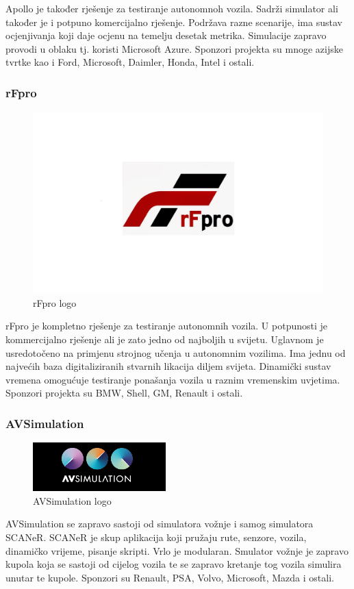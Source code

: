 Apollo je također rješenje za testiranje autonomnoh vozila. Sadrži simulator ali također je i potpuno komercijalno rješenje. Podržava razne scenarije, ima sustav ocjenjivanja koji daje ocjenu na temelju desetak metrika. Simulacije zapravo provodi u oblaku tj. koristi Microsoft Azure. Sponzori projekta su mnoge azijske tvrtke kao i Ford, Microsoft, Daimler, Honda, Intel i ostali.

\subsubsection{rFpro}
\begin{figure}[ht!]
  \centering
  \includegraphics[scale=0.2]{images/rfpro_logo.jpg}
  \caption{rFpro logo\cite{logo:rfpro}}
\end{figure}

rFpro je kompletno rješenje za testiranje autonomnih vozila. U potpunosti je kommercijalno rješenje ali je zato jedno od najboljih u svijetu. Uglavnom je usredotočeno na primjenu strojnog učenja u autonomnim vozilima. Ima jednu od najvećih baza digitaliziranih stvarnih likacija diljem svijeta. Dinamički sustav vremena omogućuje testiranje ponašanja vozila u raznim vremenskim uvjetima. Sponzori projekta su BMW, Shell, GM, Renault i ostali.
\pagebreak
\subsubsection{AVSimulation}
\begin{figure}[ht!]
  \centering
  \includegraphics{images/avsimulation_logo.png}
  \caption{AVSimulation logo\cite{logo:avsimulation}}
\end{figure}

AVSimulation se zapravo sastoji od simulatora vožnje i samog simulatora SCANeR. SCANeR je skup aplikacija koji pružaju rute, senzore, vozila, dinamičko vrijeme, pisanje skripti. Vrlo je modularan. Smulator vožnje je zapravo kupola koja se sastoji od cijelog vozila te se zapravo kretanje tog vozila simulira unutar te kupole. Sponzori su Renault, PSA, Volvo, Microsoft, Mazda i ostali.
\newpage